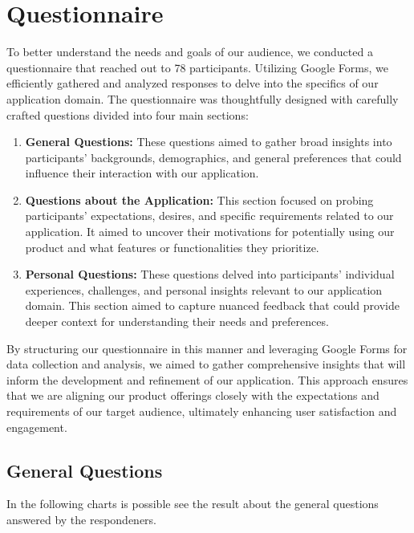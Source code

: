 \section{Questionnaire}
To better understand the needs and goals of our audience, we conducted a questionnaire that reached out to 78 participants. Utilizing Google Forms, we efficiently gathered and analyzed responses to delve into the specifics of our application domain. The questionnaire was thoughtfully designed with carefully crafted questions divided into four main sections:

\begin{enumerate}
	\item \textbf{General Questions:}
	These questions aimed to gather broad insights into participants' backgrounds, demographics, and general preferences that could influence their interaction with our application.
	
	\item \textbf{Questions about the Application:}
	This section focused on probing participants' expectations, desires, and specific requirements related to our application. It aimed to uncover their motivations for potentially using our product and what features or functionalities they prioritize.
	
	\item \textbf{Personal Questions:}
	These questions delved into participants' individual experiences, challenges, and personal insights relevant to our application domain. This section aimed to capture nuanced feedback that could provide deeper context for understanding their needs and preferences.
	
\end{enumerate}

By structuring our questionnaire in this manner and leveraging Google Forms for data collection and analysis, we aimed to gather comprehensive insights that will inform the development and refinement of our application. This approach ensures that we are aligning our product offerings closely with the expectations and requirements of our target audience, ultimately enhancing user satisfaction and engagement.\\

\subsection{General Questions}
In the following charts is possible see the result about the general questions answered by the respondeners.\\

